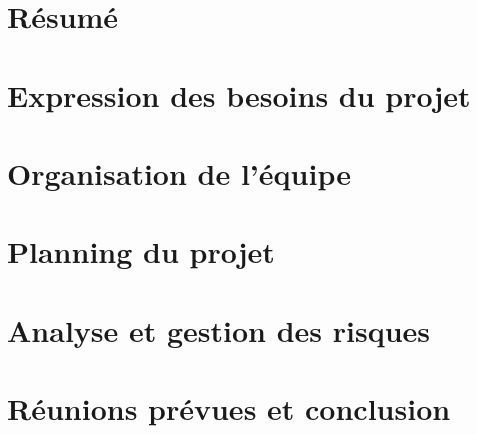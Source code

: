 \documentclass[a4paper,12pt]{article}
\begin{document}

\newpage
\tableofcontents
\section*{Résumé}

\newpage
\section{Expression des besoins du projet}

\section{Organisation de l'équipe}

\section{Planning du projet}

\section{Analyse et gestion des risques}

\section{Réunions prévues et conclusion}

\end{document}
